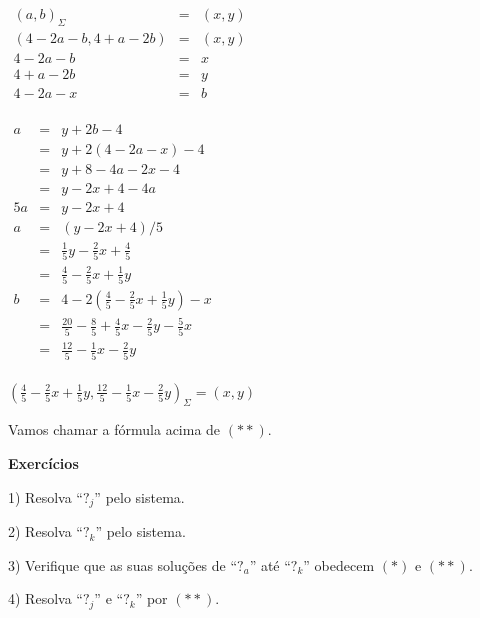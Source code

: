 \documentclass[oneside]{book}
\begin{document}
{\begin{minipage}[t]{2.25in}
\begin{boxedminipage}[t]{2.25in}
$\begin{array}{rcl}
   (a,b)_Σ &=& (x,y) \\
   (4-2a-b, 4+a-2b) &=& (x,y) \\
   4-2a-b &=& x \\
   4+a-2b &=& y \\
   4-2a-x &=& b \\
 \end{array}
$

\ssk

$\begin{array}{rcl}
   a &=& y+2b-4 \\
     &=& y+2(4-2a-x)-4 \\
     &=& y+8-4a-2x-4 \\
     &=& y-2x+4-4a \\
   5a &=& y-2x+4 \\
    a &=& (y-2x+4)/5 \\
      &=& \frac15 y - \frac25 x + \frac45 \\
      &=& \frac45 - \frac25 x + \frac15 y \\
    b &=& 4-2(\frac45 - \frac25 x + \frac15 y)-x \\
      &=& \frac{20}5 - \frac85 + \frac45 x - \frac25 y  -\frac55 x \\
      &=& \frac{12}5 - \frac15 x - \frac25 y \\
 \end{array}
$

\ssk

$(\frac45 - \frac25 x + \frac15y,
  \frac{12}5 - \frac15 x - \frac25 y)_Σ = (x,y)
$

\ssk

Vamos chamar a fórmula acima de $(**)$.

\end{boxedminipage}

\end{minipage}

\bsk

{\bf Exercícios}

1) Resolva ``$?_j$'' pelo sistema.

2) Resolva ``$?_k$'' pelo sistema.

3) Verifique que as suas soluções de ``$?_a$'' até ``$?_k$'' obedecem
$(*)$ e $(**)$.

4) Resolva ``$?_j$'' e ``$?_k$'' por $(**)$.

}
\end{document}
